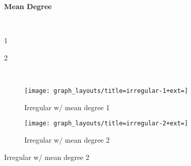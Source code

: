 \begin{figure}
\begin{center}

\begin{minipage}{0.05\textwidth}
~
\end{minipage}%
\begin{minipage}{0.95\textwidth}
\begin{minipage}{0.05\textwidth}
~
\end{minipage}%
\begin{minipage}{0.95\textwidth}
\centering
\large
\textbf{Mean Degree}
\end{minipage}
\begin{minipage}{0.05\textwidth}
~
\end{minipage}%
\begin{minipage}{0.95\linewidth}
\begin{minipage}{0.5\textwidth}
\centering
\large
1
\end{minipage}%
\begin{minipage}{0.5\textwidth}
\centering
\large
2
\end{minipage}
\end{minipage}
\end{minipage}\\
\vspace{2ex}





\begin{minipage}{0.05\textwidth}
\large
{}
\end{minipage}%
\begin{minipage}{0.95\textwidth}
\begin{minipage}{0.05\linewidth}
\large
{}
\end{minipage}%
\begin{minipage}{0.95\linewidth}
\begin{subfigure}[b]{0.5\textwidth}
\centering
\texttt{[image: graph\_layouts/title=irregular-1+ext=]}%
\caption{
Irregular w/ mean degree 1
}
\label{fig:irregular_1}
\end{subfigure}
\begin{subfigure}[b]{0.5\textwidth}
\centering
\texttt{[image: graph\_layouts/title=irregular-2+ext=]}%
\caption{
Irregular w/ mean degree 2
}
\label{fig:irregular_2}
\label{fig:irregular_degree_2}
\end{subfigure}


\end{minipage}
\end{minipage}
\end{center}
\end{figure}
